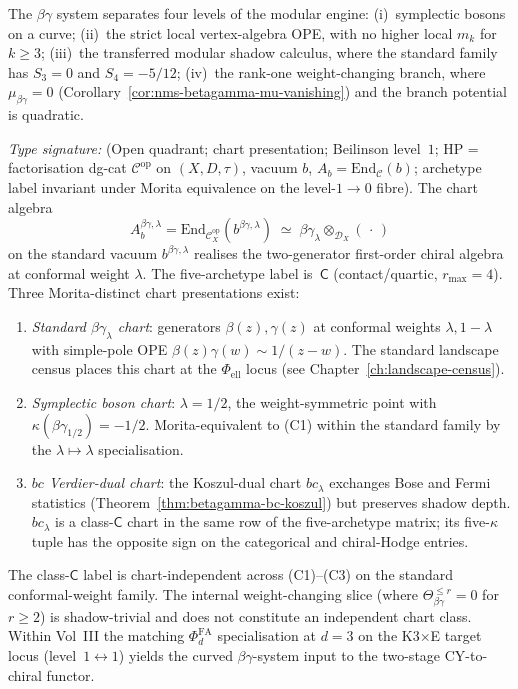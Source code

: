 \begin{remark}
\label{rem:betagamma-four-level}
The $\beta\gamma$ system separates four levels of the modular
engine:
(i)~symplectic bosons on a curve;
(ii)~the strict local vertex-algebra OPE, with no higher local
$m_k$ for $k\ge3$;
(iii)~the transferred modular shadow calculus, where the standard
family has $S_3=0$ and $S_4=-5/12$;
(iv)~the rank-one weight-changing branch, where
$\mu_{\beta\gamma}=0$
(Corollary~\ref{cor:nms-betagamma-mu-vanishing}) and the branch
potential is quadratic.
\end{remark}

\begin{remark}
\label{rem:betagamma-chart-class-enumeration}
\emph{Type signature:} (Open quadrant; chart presentation;
Beilinson level~$1$; HP = factorisation dg-cat
$\mathcal{C}^{\mathrm{op}}$ on $(X, D, \tau)$, vacuum $b$,
$A_b = \mathrm{End}_\mathcal{C}(b)$; archetype label invariant
under Morita equivalence on the level-$1\to 0$ fibre).
The chart algebra
\[
A_b^{\beta\gamma, \lambda} =
\mathrm{End}_{\mathcal{C}^{\mathrm{op}}_X}(b^{\beta\gamma,\lambda})
\;\simeq\;
\beta\gamma_\lambda\otimes_{\mathcal{D}_X}(\,\cdot\,)
\]
on the standard vacuum $b^{\beta\gamma,\lambda}$ realises the
two-generator first-order chiral algebra at conformal weight
$\lambda$. The five-archetype label is~$\mathsf{C}$ (contact/quartic,
$r_{\max}=4$). Three Morita-distinct chart presentations exist:
\begin{enumerate}[label=\textup{(C\arabic*)}]
\item \emph{Standard $\beta\gamma_\lambda$ chart}: generators
$\beta(z),\gamma(z)$ at conformal weights $\lambda, 1-\lambda$ with
simple-pole OPE $\beta(z)\gamma(w)\sim 1/(z{-}w)$. The standard
landscape census places this chart at the $\Phi_{\mathrm{ell}}$
locus (see Chapter~\ref{ch:landscape-census}).
\item \emph{Symplectic boson chart}: $\lambda=1/2$, the
weight-symmetric point with $\kappa(\beta\gamma_{1/2})=-1/2$.
Morita-equivalent to (C1) within the standard family by the
$\lambda\mapsto\lambda$ specialisation.
\item \emph{$bc$ Verdier-dual chart}: the Koszul-dual chart
$bc_\lambda$ exchanges Bose and Fermi statistics
(Theorem~\ref{thm:betagamma-bc-koszul}) but preserves shadow depth.
$bc_\lambda$ is a class-$\mathsf{C}$ chart in the same row of the
five-archetype matrix; its five-$\kappa$ tuple has the opposite
sign on the categorical and chiral-Hodge entries.
\end{enumerate}
The class-$\mathsf{C}$ label is chart-independent across (C1)--(C3)
on the standard conformal-weight family. The internal
weight-changing slice (where $\Theta_{\beta\gamma}^{\le r}=0$ for
$r\ge2$) is shadow-trivial and does not constitute an independent
chart class. Within Vol~III the matching $\Phi_d^{\mathrm{FA}}$
specialisation at $d=3$ on the K3$\times$E target locus
(level~$1\leftrightarrow 1$) yields the curved
$\beta\gamma$-system input to the two-stage CY-to-chiral functor.
\end{remark}

